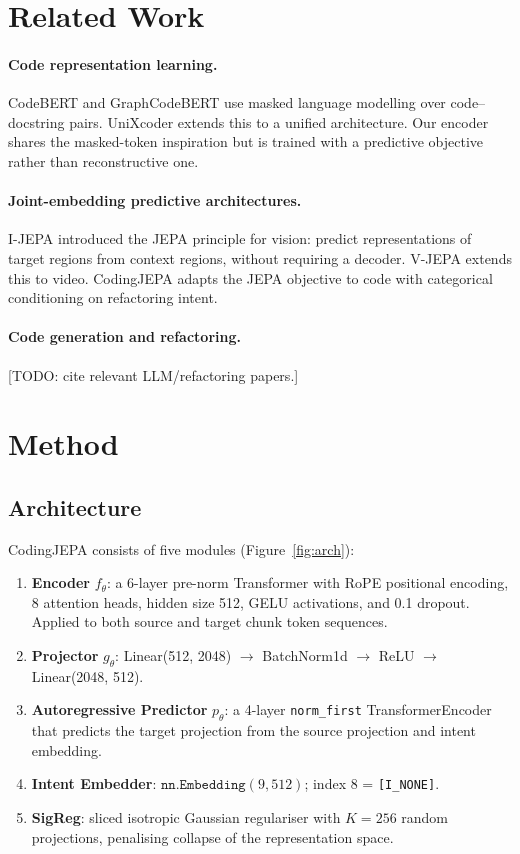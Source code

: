 \documentclass[10pt]{article}
\begin{document}
\section{Related Work}
\label{sec:related}

\paragraph{Code representation learning.}
CodeBERT \cite{feng2020codebert} and GraphCodeBERT \cite{guo2021graphcodebert} use masked
language modelling over code–docstring pairs. UniXcoder \cite{guo2022unixcoder} extends this
to a unified architecture. Our encoder shares the masked-token inspiration but is trained
with a predictive objective rather than reconstructive one.

\paragraph{Joint-embedding predictive architectures.}
I-JEPA \cite{assran2023ijepa} introduced the JEPA principle for vision: predict representations
of target regions from context regions, without requiring a decoder. V-JEPA \cite{bardes2023vjepa}
extends this to video. CodingJEPA adapts the JEPA objective to code with categorical
conditioning on refactoring intent.

\paragraph{Code generation and refactoring.}
[TODO: cite relevant LLM/refactoring papers.]

\section{Method}
\label{sec:method}

\subsection{Architecture}

CodingJEPA consists of five modules (Figure~\ref{fig:arch}):
\begin{enumerate}
  \item \textbf{Encoder} $f_\theta$: a 6-layer pre-norm Transformer with RoPE positional
        encoding, 8 attention heads, hidden size 512, GELU activations, and 0.1 dropout.
        Applied to both source and target chunk token sequences.
  \item \textbf{Projector} $g_\theta$: Linear(512, 2048) $\to$ BatchNorm1d $\to$ ReLU $\to$
        Linear(2048, 512).
  \item \textbf{Autoregressive Predictor} $p_\theta$: a 4-layer \texttt{norm\_first}
        TransformerEncoder that predicts the target projection from the source projection and
        intent embedding.
  \item \textbf{Intent Embedder}: $\texttt{nn.Embedding}(9, 512)$; index 8 = \texttt{[I\_NONE]}.
  \item \textbf{SigReg}: sliced isotropic Gaussian regulariser with $K=256$ random projections,
        penalising collapse of the representation space.
\end{enumerate}
\end{document}

